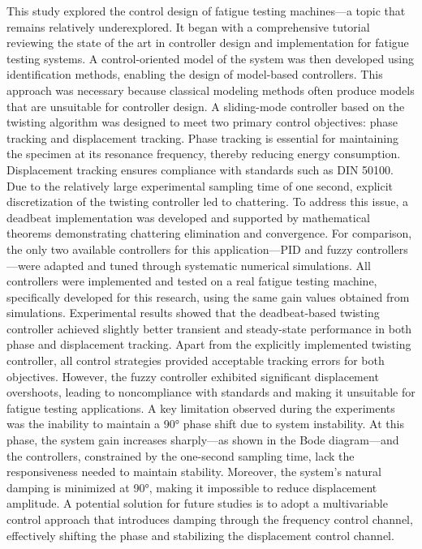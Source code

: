 \documentclass[lettersize,journal]{IEEEtran}
\begin{document}
This study explored the control design of fatigue testing machines—a topic that remains relatively underexplored. It began with a comprehensive tutorial reviewing the state of the art in controller design and implementation for fatigue testing systems. A control-oriented model of the system was then developed using identification methods, enabling the design of model-based controllers. This approach was necessary because classical modeling methods often produce models that are unsuitable for controller design.
A sliding-mode controller based on the twisting algorithm was designed to meet two primary control objectives: phase tracking and displacement tracking. Phase tracking is essential for maintaining the specimen at its resonance frequency, thereby reducing energy consumption. Displacement tracking ensures compliance with standards such as DIN 50100. Due to the relatively large experimental sampling time of one second, explicit discretization of the twisting controller led to chattering. To address this issue, a deadbeat implementation was developed and supported by mathematical theorems demonstrating chattering elimination and convergence. For comparison, the only two available controllers for this application—PID and fuzzy controllers—were adapted and tuned through systematic numerical simulations.
All controllers were implemented and tested on a real fatigue testing machine, specifically developed for this research, using the same gain values obtained from simulations. Experimental results showed that the deadbeat-based twisting controller achieved slightly better transient and steady-state performance in both phase and displacement tracking. Apart from the explicitly implemented twisting controller, all control strategies provided acceptable tracking errors for both objectives. However, the fuzzy controller exhibited significant displacement overshoots, leading to noncompliance with standards and making it unsuitable for fatigue testing applications.
A key limitation observed during the experiments was the inability to maintain a 90° phase shift due to system instability. At this phase, the system gain increases sharply—as shown in the Bode diagram—and the controllers, constrained by the one-second sampling time, lack the responsiveness needed to maintain stability. Moreover, the system’s natural damping is minimized at 90°, making it impossible to reduce displacement amplitude. A potential solution for future studies is to adopt a multivariable control approach that introduces damping through the frequency control channel, effectively shifting the phase and stabilizing the displacement control channel.
\end{document}
